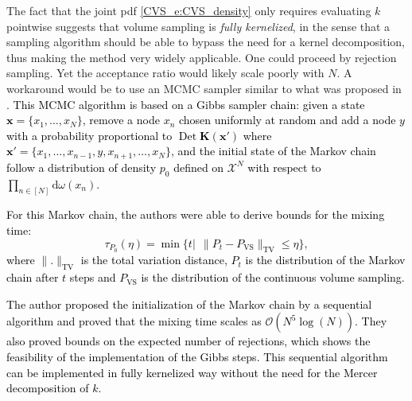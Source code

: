 \documentclass[twoside,11pt]{book}
\newcommand{\rev}[1]{\textcolor{black}{#1}}
\newtheorem{theorem}{Theorem}
\numberwithin{theorem}{chapter}
\numberwithin{definition}{chapter}
\numberwithin{proposition}{chapter}
\numberwithin{corollary}{chapter}
\numberwithin{example}{chapter}
\numberwithin{lemma}{chapter}
\numberwithin{assumption}{chapter}
\numberwithin{equation}{chapter}
\numberwithin{figure}{chapter}
\DeclareMathOperator{\Det}{Det}
\begin{document}
The fact that the joint pdf \eqref{CVS_e:CVS_density} only requires evaluating $k$ pointwise suggests that volume sampling is \emph{fully kernelized}, in the sense that a sampling algorithm should be able to bypass the need for a kernel decomposition, thus making the method very widely applicable.
One could proceed by rejection sampling. Yet the acceptance ratio would likely scale poorly with $N$.  A workaround would be to use an MCMC sampler similar to what was proposed in \citep{ReGh19}.
\rev{
This MCMC algorithm is based on a Gibbs sampler chain: given a state $\bm{x} = \{x_{1}, \dots , x_{N} \}$, remove a node $x_{n}$ chosen uniformly at random and add a node $y$ with a probability proportional to $\Det \bm{K}(\bm{x}')$ where $\bm{x}' = \{x_{1}, \dots, x_{n-1}, y,x_{n+1}, \dots, x_{N} \}$, and the initial state of the Markov chain follow a distribution of density $p_{0}$ defined on $\mathcal{X}^{N}$ with respect to $\prod\limits_{n \in [N]} \mathrm{d}\omega(x_{n})$. }

\rev{For this Markov chain, the authors were able to derive bounds for the mixing time:
$$\tau_{P_{0}}(\eta) = \min \{t |\:\: \|P_{t} - P_{\mathrm{VS}}\|_{\mathrm{TV}} \leq \eta \},$$ where $\|.\|_{\mathrm{TV}}$ is the total variation distance, $P_{t}$ is the distribution of the Markov chain after $t$ steps and $P_{\mathrm{VS}}$ is the distribution of the continuous volume sampling. }



\rev{ The author proposed the initialization of the Markov chain by a sequential algorithm and proved that the mixing time scales as $\mathcal{O}(N^{5}\log(N))$.
They also proved bounds on the expected number of rejections, which shows the feasibility of the implementation of the Gibbs steps.
  This sequential algorithm can be implemented in fully kernelized way without the need for the Mercer decomposition of $k$.}
\end{document}
